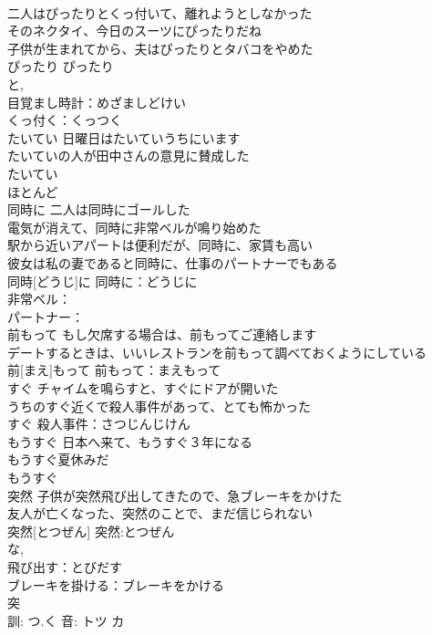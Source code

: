\documentclass[8pt]{extreport}
\begin{document}
\begin{CJK}{UTF8}{min}
\\	二人はぴったりとくっ付いて、離れようとしなかった 
\\	そのネクタイ、今日のスーツにぴったりだね 
\\	子供が生まれてから、夫はぴったりとタバコをやめた 
\\	ぴったり			ぴったり
\\	と, 
\\	目覚まし時計：めざましどけい
\\	くっ付く：くっつく
\\	たいてい	日曜日はたいていうちにいます 
\\	たいていの人が田中さんの意見に賛成した 
\\	たいてい			
\\	ほとんど 
\\	同時に	二人は同時にゴールした 
\\	電気が消えて、同時に非常ベルが鳴り始めた 
\\	駅から近いアパートは便利だが、同時に、家賃も高い 
\\	彼女は私の妻であると同時に、仕事のパートナーでもある 
\\	同時[どうじ]に			同時に：どうじに
\\	非常ベル：
\\	パートナー：
\\	前もって	もし欠席する場合は、前もってご連絡します 
\\	デートするときは、いいレストランを前もって調べておくようにしている 
\\	前[まえ]もって			前もって：まえもって
\\	すぐ	チャイムを鳴らすと、すぐにドアが開いた 
\\	うちのすぐ近くで殺人事件があって、とても怖かった 
\\	すぐ			殺人事件：さつじんじけん
\\	もうすぐ	日本へ来て、もうすぐ３年になる 
\\	もうすぐ夏休みだ 
\\	もうすぐ						
\\	突然	子供が突然飛び出してきたので、急ブレーキをかけた 
\\	友人が亡くなった、突然のことで、まだ信じられない 
\\	突然[とつぜん]			突然:とつぜん
\\	な, 
\\	飛び出す：とびだす
\\	ブレーキを掛ける：ブレーキをかける
\\	突 
\\	訓: つ.く 音: トツ カ 

\end{CJK}
\end{document}

